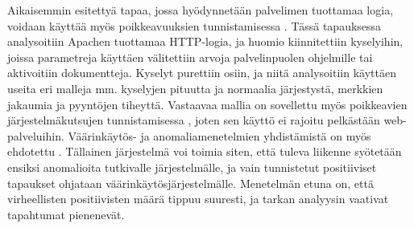 Aikaisemmin esitettyä tapaa, jossa hyödynnetään palvelimen tuottamaa logia, voidaan käyttää myös poikkeavuuksien tunnistamisessa \cite{Multi}. Tässä tapauksessa analysoitiin Apachen tuottamaa HTTP-logia, ja huomio kiinnitettiin kyselyihin, joissa parametreja käyttäen välitettiin arvoja palvelinpuolen ohjelmille tai aktivoitiin dokumentteja. Kyselyt purettiin osiin, ja niitä analysoitiin käyttäen useita eri malleja 
mm. kyselyjen pituutta ja normaalia järjestystä, merkkien jakaumia ja pyyntöjen tiheyttä. Vastaavaa mallia on sovellettu myös poikkeavien järjestelmäkutsujen tunnistamisessa \cite{SystemCall}, joten sen käyttö ei rajoitu pelkästään web-palveluihin. Väärinkäytös- ja anomaliamenetelmien yhdistämistä on myös ehdotettu \cite{Combination}. Tällainen järjestelmä voi toimia siten, että tuleva liikenne syötetään ensiksi anomalioita tutkivalle järjestelmälle, ja vain tunnistetut positiiviset tapaukset ohjataan väärinkäytösjärjestelmälle. Menetelmän etuna on, että virheellisten positiivisten määrä tippuu suuresti, ja tarkan analyysin vaativat tapahtumat pienenevät.


